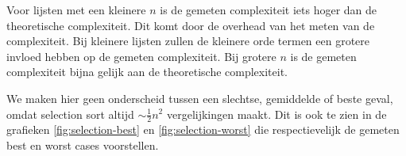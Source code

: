 \documentclass[a4paper]{article}
\begin{document}
\par

Voor lijsten met een kleinere $n$ is de gemeten complexiteit iets hoger dan de theoretische complexiteit.
Dit komt door de overhead van het meten van de complexiteit. Bij kleinere lijsten zullen de kleinere orde termen een grotere invloed hebben op de gemeten complexiteit.
Bij grotere $n$ is de gemeten complexiteit bijna gelijk aan de theoretische complexiteit.

\par

We maken hier geen onderscheid tussen een slechtse, gemiddelde of beste geval, omdat selection sort altijd $\sim \frac{1}{2} n^2$ vergelijkingen maakt.
Dit is ook te zien in de grafieken \ref{fig:selection-best} en \ref{fig:selection-worst} die respectievelijk de gemeten best en worst cases voorstellen.
\end{document}
